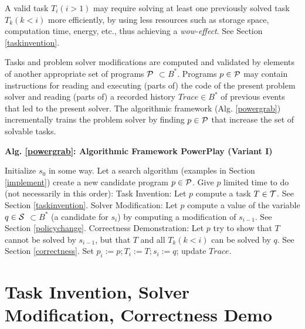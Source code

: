 \documentclass{article}
\begin{document}
A valid task $T_i(i>1)$ may 
require solving at least one previously solved task $T_k (k<i)$ more efficiently, by using less
resources such as storage space, computation time, energy, etc.,
thus achieving a {\em wow-effect}.
See Section \ref{taskinvention}.

Tasks and problem solver modifications  are computed and validated by elements of 
another appropriate set of programs $\cal P$ $\subset B^*$. Programs $p \in \cal P$
may contain instructions for reading and executing (parts of) the code of the present problem solver and reading (parts of) a recorded
history $ Trace \in B^*$ of previous events that led to the present solver. 
The algorithmic framework (Alg. \ref{powergrab})
incrementally trains the problem solver by finding $p \in \cal P$ that increase the set of solvable tasks.

\begin{algorithm}{\bf Alg. \ref{powergrab}: Algorithmic Framework {\sc PowerPlay} (Variant I)} 
\label{powergrab}
\begin{algorithmic}
\STATE Initialize $s_0$ in some way.
\REPEAT 
\STATE Let a search algorithm (examples in Section \ref{implement}) create a new candidate program $p  \in \cal P$. Give $p$ limited time to do (not necessarily in this order):
 \STATE    {\bf *} {\sc Task Invention}: Let $p$ compute a task $T \in \cal T$. See Section \ref{taskinvention}.
\STATE  {\bf *}  {\sc Solver Modification}: Let $p$ compute a value of the variable $q \in \cal S$ $ \subset B^*$  (a candidate for  $s_i$) by computing a modification of $s_{i-1}$. See Section \ref{policychange}.
\STATE   {\bf *}  {\sc Correctness Demonstration}: Let $p$ try to show that $T$ cannot be solved by $s_{i-1}$, but that $T$ and all $T_k (k<i)$ can be solved by  $q$.  See Section \ref{correctness}.
\STATE Set $p_i := p; T_i := T; s_i := q$; update $Trace$.
\ENDFOR
\end{algorithmic}
\end{algorithm}



\section{{\sc Task Invention},  {\sc Solver Modification},  {\sc Correctness Demo}}
\label{more}
\end{document}
